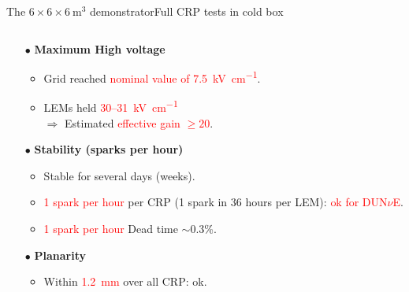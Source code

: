 \documentclass[10pt]{beamer}
\begin{document}
\begin{frame}{The \texorpdfstring{$6 \times 6 \times \SI{6}{\meter\cubed}$}{666} demonstrator}{Full CRP tests in cold box}
\begin{columns}
\begin{column}{0.6\textwidth}
\begin{scriptsize}
	    			\begin{itemize}
	    				\item[$\bullet$] \textbf{Maximum High voltage}
	    				\begin{itemize}
	    					\item Grid reached \textcolor{red}{nominal value of \SI{7.5}{\kilo\volt\per\centi\meter}}.
	    					\item LEMs held \textcolor{red}{30--\SI{31}{\kilo\volt\per\centi\meter}}\\
				    					$\Rightarrow$ Estimated \textcolor{red}{effective gain $\geq 20$}.
	    				\end{itemize}
	    				\item[$\bullet$] \textbf{Stability (sparks per hour)}
	    				\begin{itemize}
	    					\item Stable for several days (weeks).
	    					\item \textcolor{red}{1 spark per hour} per CRP (1 spark in 36 hours per LEM): \textcolor{red}{ok for DUN$\nu$E}.
	    					\item \textcolor{red}{1 spark per hour} Dead time $\sim$0.3\%.
	    				\end{itemize}
	    				\item[$\bullet$] \textbf{Planarity}
	    				\begin{itemize}
	    					\item Within \textcolor{red}{\SI{1.2}{\milli\meter}} over all CRP: ok.
	    				\end{itemize}
	    			\end{itemize}
	    		\end{scriptsize}

\end{column}
\end{columns}
\end{frame}
\end{document}
